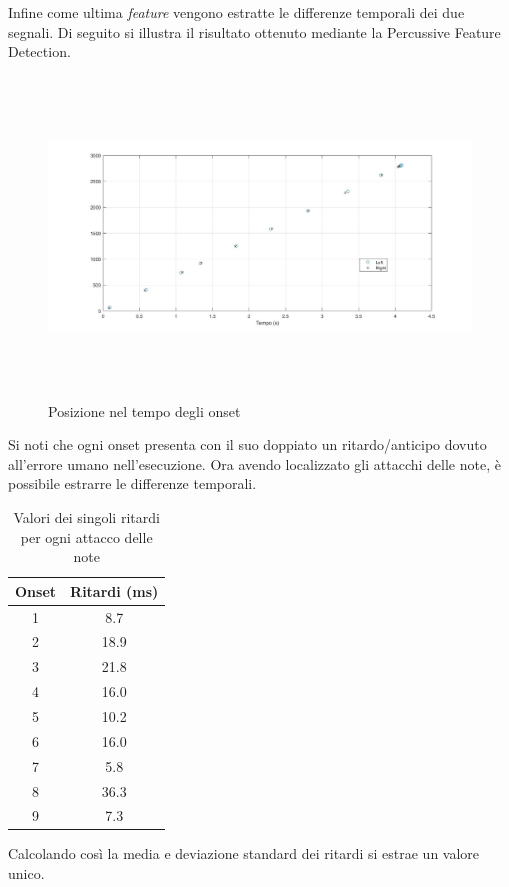 \documentclass[12pt]{report}
\begin{document}
\clearpage

Infine come ultima {\itshape feature} vengono estratte le differenze temporali dei due segnali. Di seguito si illustra il risultato ottenuto mediante la Percussive Feature Detection.

\begin{figure}[htbp]
\centerline{\includegraphics[height=85mm]{img/onset_loc}}
\caption{Posizione nel tempo degli onset}
\label{fig:onset_loc}
\end{figure}

Si noti che ogni onset presenta con il suo doppiato un ritardo/anticipo dovuto all'errore umano nell'esecuzione. Ora avendo localizzato gli attacchi delle note, è possibile estrarre le differenze temporali.

\clearpage

\begin{table}[htbp]
\begin{center}
\begin{tabular}{|c|c|}
\hline
Onset & Ritardi (ms)\\
\hline
1 & 8.7\\
2 & 18.9\\
3 & 21.8\\
4 & 16.0\\
5 & 10.2\\
6 & 16.0\\
7 & 5.8\\
8 & 36.3\\
9 & 7.3\\
\hline
\end{tabular}
\end{center}
\caption{Valori dei singoli ritardi per ogni attacco delle note}
\label{tab:delay}
\end{table}
Calcolando così la media e deviazione standard dei ritardi si estrae un valore unico.
\end{document}

